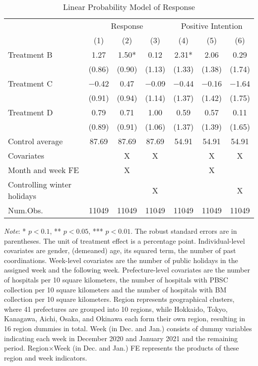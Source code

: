 \documentclass[12pt, a4paper]{article}
\begin{document}
\begin{table}[H]

\caption{\label{tab:reply-lm}Linear Probability Model of Response}
\centering
\fontsize{8}{10}\selectfont
\begin{threeparttable}
\begin{tabular}[t]{lcccccc}
\toprule
\multicolumn{1}{c}{ } & \multicolumn{3}{c}{Response} & \multicolumn{3}{c}{Positive Intention} \\
\cmidrule(l{3pt}r{3pt}){2-4} \cmidrule(l{3pt}r{3pt}){5-7}
  & (1) & (2) & (3) & (4) & (5) & (6)\\
\midrule
Treatment B & \num{1.27} & \num{1.50}* & \num{0.12} & \num{2.31}* & \num{2.06} & \num{0.29}\\
 & (\num{0.86}) & (\num{0.90}) & (\num{1.13}) & (\num{1.33}) & (\num{1.38}) & (\num{1.74})\\
Treatment C & \num{-0.42} & \num{0.47} & \num{-0.09} & \num{-0.44} & \num{-0.16} & \num{-1.64}\\
 & (\num{0.91}) & (\num{0.94}) & (\num{1.14}) & (\num{1.37}) & (\num{1.42}) & (\num{1.75})\\
Treatment D & \num{0.79} & \num{0.71} & \num{1.00} & \num{0.59} & \num{0.57} & \num{0.11}\\
 & (\num{0.89}) & (\num{0.91}) & (\num{1.06}) & (\num{1.37}) & (\num{1.39}) & (\num{1.65})\\
\midrule
Control average & 87.69 & 87.69 & 87.69 & 54.91 & 54.91 & 54.91\\
Covariates &  & X & X &  & X & X\\
Month and week FE &  & X &  &  & X & \\
Controlling winter holidays &  &  & X &  &  & X\\
Num.Obs. & \num{11049} & \num{11049} & \num{11049} & \num{11049} & \num{11049} & \num{11049}\\
\bottomrule
\end{tabular}
\begin{tablenotes}
\item \emph{Note}: * $p < 0.1$, ** $p < 0.05$, *** $p < 0.01$. The robust standard errors are in parentheses. The unit of treatment effect is a percentage point. Individual-level covariates are gender, (demeaned) age, its squared term, the number of past coordinations. Week-level covariates are the number of public holidays in the assigned week and the following week. Prefecture-level covariates are the number of hospitals per 10 square kilometers, the number of hospitals with PBSC collection per 10 square kilometers and the number of hospitals with BM collection per 10 square kilometers. Region represents geographical clusters, where 41 prefectures are grouped into 10 regions, while Hokkaido, Tokyo, Kanagawa, Aichi, Osaka, and Okinawa each form their own region, resulting in 16 region dummies in total. Week (in Dec. and Jan.) consists of dummy variables indicating each week in December 2020 and January 2021 and the remaining period. Region$\times$Week (in Dec. and Jan.) FE represents the products of these region and week indicators.
\end{tablenotes}
\end{threeparttable}
\end{table}
\end{document}
